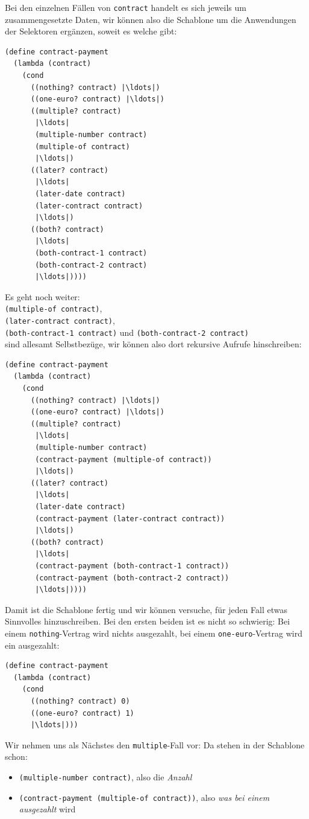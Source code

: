 %
Bei den einzelnen Fällen von \lstinline{contract} handelt es sich
jeweils um zusammengesetzte Daten, wir können also die Schablone um
die Anwendungen der Selektoren ergänzen, soweit es welche gibt:
%
\begin{lstlisting}
(define contract-payment
  (lambda (contract)
    (cond
      ((nothing? contract) |\ldots|)
      ((one-euro? contract) |\ldots|)
      ((multiple? contract)
       |\ldots|
       (multiple-number contract)
       (multiple-of contract)
       |\ldots|)
      ((later? contract)
       |\ldots|
       (later-date contract)
       (later-contract contract)
       |\ldots|)
      ((both? contract)
       |\ldots|
       (both-contract-1 contract)
       (both-contract-2 contract)
       |\ldots|))))
\end{lstlisting}
%
Es geht noch weiter:\\
\lstinline{(multiple-of contract)},\\
\lstinline{(later-contract contract)},\\
\lstinline{(both-contract-1 contract)}  und \lstinline{(both-contract-2 contract)} \\
sind allesamt
Selbstbezüge, wir können also dort rekursive Aufrufe hinschreiben:
%
\begin{lstlisting}
(define contract-payment
  (lambda (contract)
    (cond
      ((nothing? contract) |\ldots|)
      ((one-euro? contract) |\ldots|)
      ((multiple? contract)
       |\ldots|
       (multiple-number contract)
       (contract-payment (multiple-of contract))
       |\ldots|)
      ((later? contract)
       |\ldots|
       (later-date contract)
       (contract-payment (later-contract contract))
       |\ldots|)
      ((both? contract)
       |\ldots|
       (contract-payment (both-contract-1 contract))
       (contract-payment (both-contract-2 contract))
       |\ldots|))))
\end{lstlisting}
%
Damit ist die Schablone fertig und wir können versuche, für jeden Fall
etwas Sinnvolles hinzuschreiben.  Bei den ersten beiden ist es nicht
so schwierig: Bei einem \lstinline{nothing}-Vertrag wird nichts
ausgezahlt, bei einem \lstinline{one-euro}-Vertrag wird ein 
ausgezahlt:
%
\begin{lstlisting}
(define contract-payment
  (lambda (contract)
    (cond
      ((nothing? contract) 0)
      ((one-euro? contract) 1)
      |\ldots|)))
\end{lstlisting}
%
Wir nehmen uns als Nächstes den \lstinline{multiple}-Fall vor: Da
stehen in der Schablone schon:
\begin{itemize}
\item\lstinline{(multiple-number contract)}, also die \emph{Anzahl}
\item\lstinline{(contract-payment (multiple-of contract))}, also
  \emph{was bei einem ausgezahlt} wird
\end{itemize}
